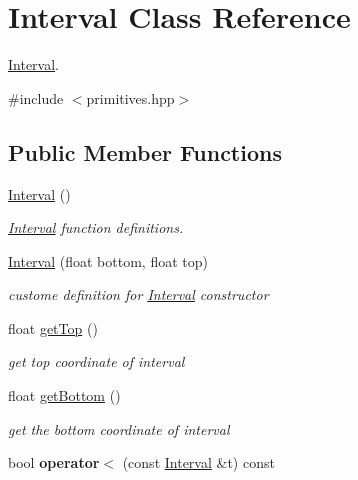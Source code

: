 \hypertarget{classInterval}{}\section{Interval Class Reference}
\label{classInterval}


\hyperlink{classInterval}{Interval}.  




{\ttfamily \#include $<$primitives.\+hpp$>$}

\subsection*{Public Member Functions}
\begin{DoxyCompactItemize}
\item 
\mbox{\label{classInterval_ae48b9a9e9f672f81977627b609e32429}} 
\hyperlink{classInterval_ae48b9a9e9f672f81977627b609e32429}{Interval} ()
\begin{DoxyCompactList}\small\item\em \hyperlink{classInterval}{Interval} function definitions. \end{DoxyCompactList}\item 
\mbox{\label{classInterval_ae110575371fc4dd190e90f9da3364de5}} 
\hyperlink{classInterval_ae110575371fc4dd190e90f9da3364de5}{Interval} (float bottom, float top)
\begin{DoxyCompactList}\small\item\em custome definition for \hyperlink{classInterval}{Interval} constructor \end{DoxyCompactList}\item 
\mbox{\label{classInterval_aaad630e0a28e903cf91f8d90376015dc}} 
float \hyperlink{classInterval_aaad630e0a28e903cf91f8d90376015dc}{get\+Top} ()
\begin{DoxyCompactList}\small\item\em get top coordinate of interval \end{DoxyCompactList}\item 
\mbox{\label{classInterval_aebf44908f1bd7269db6d9202ac759cd7}} 
float \hyperlink{classInterval_aebf44908f1bd7269db6d9202ac759cd7}{get\+Bottom} ()
\begin{DoxyCompactList}\small\item\em get the bottom coordinate of interval \end{DoxyCompactList}\item 
\mbox{\label{classInterval_a7c8c171ee63c5c60aa775b29cfa17eb1}} 
bool {\bfseries operator$<$} (const \hyperlink{classInterval}{Interval} \&t) const
\end{DoxyCompactItemize}
